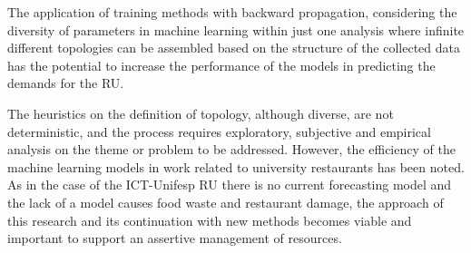        The application of training methods with backward propagation, considering the diversity of parameters in machine learning within just one analysis where infinite different topologies can be assembled based on the structure of the collected data has the potential to increase the performance of the models in predicting the demands for the RU. 
        
        The heuristics on the definition of topology, although diverse, are not deterministic, and the process requires exploratory, subjective and empirical analysis on the theme or problem to be addressed. However, the efficiency of the machine learning models in work related to university restaurants has been noted. As in the case of the ICT-Unifesp RU there is no current forecasting model and the lack of a model causes food waste and restaurant damage, the approach of this research and its continuation with new methods becomes viable and important to support an assertive management of resources.